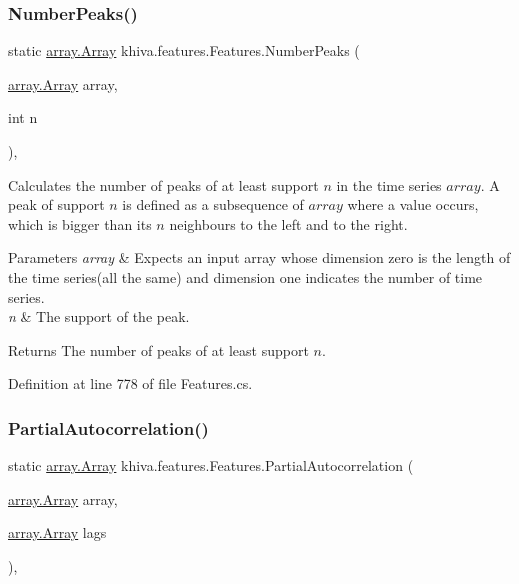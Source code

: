 \subsubsection{\texorpdfstring{Number\+Peaks()}{NumberPeaks()}}
{\footnotesize\ttfamily static \mbox{\hyperlink{classkhiva_1_1array_1_1_array}{array.\+Array}} khiva.\+features.\+Features.\+Number\+Peaks (\begin{DoxyParamCaption}\item[{\mbox{\hyperlink{classkhiva_1_1array_1_1_array}{array.\+Array}}}]{array,  }\item[{int}]{n }\end{DoxyParamCaption})\hspace{0.3cm}{\ttfamily [inline]}, {\ttfamily [static]}}



Calculates the number of peaks of at least support $n$ in the time series $array$. A peak of support $n$ is defined as a subsequence of $array$ where a value occurs, which is bigger than its $n$ neighbours to the left and to the right. 


\begin{DoxyParams}{Parameters}
{\em array} & Expects an input array whose dimension zero is the length of the time series(all the same) and dimension one indicates the number of time series.\\
\hline
{\em n} & The support of the peak.\\
\hline
\end{DoxyParams}
\begin{DoxyReturn}{Returns}
The number of peaks of at least support $n$.
\end{DoxyReturn}


Definition at line 778 of file Features.\+cs.

\mbox{\label{classkhiva_1_1features_1_1_features_a01ba2fa7975e7cddf82c93bf515856a6}} 
\subsubsection{\texorpdfstring{Partial\+Autocorrelation()}{PartialAutocorrelation()}}
{\footnotesize\ttfamily static \mbox{\hyperlink{classkhiva_1_1array_1_1_array}{array.\+Array}} khiva.\+features.\+Features.\+Partial\+Autocorrelation (\begin{DoxyParamCaption}\item[{\mbox{\hyperlink{classkhiva_1_1array_1_1_array}{array.\+Array}}}]{array,  }\item[{\mbox{\hyperlink{classkhiva_1_1array_1_1_array}{array.\+Array}}}]{lags }\end{DoxyParamCaption})\hspace{0.3cm}{\ttfamily [inline]}, {\ttfamily [static]}}



